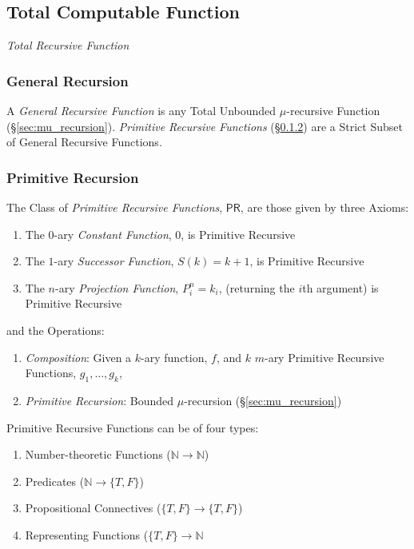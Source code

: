 \subsection{Total Computable Function}\label{sec:recursive_function}

\emph{Total Recursive Function}



\subsubsection{General Recursion}\label{sec:general_recursion}

A \emph{General Recursive Function} is any Total Unbounded
$\mu$-recursive Function (\S\ref{sec:mu_recursion}). \emph{Primitive
  Recursive Functions} (\S\ref{sec:primitive_recursion}) are a Strict
Subset of General Recursive Functions.



\subsubsection{Primitive Recursion}\label{sec:primitive_recursion}

The Class of \emph{Primitive Recursive Functions}, $\mathsf{PR}$, are
those given by three Axioms:
\begin{enumerate}
  \item The $0$-ary \emph{Constant Function}, $0$, is Primitive
    Recursive
  \item The $1$-ary \emph{Successor Function}, $S(k) = k + 1$, is
    Primitive Recursive
  \item The $n$-ary \emph{Projection Function}, $P_i^n = k_i$,
    (returning the $i$th argument) is Primitive Recursive
\end{enumerate}
and the Operations:
\begin{enumerate}
  \item \emph{Composition}: Given a $k$-ary function, $f$, and $k$
    $m$-ary Primitive Recursive Functions, $g_1, \ldots, g_k$,
  \item \emph{Primitive Recursion}: Bounded $\mu$-recursion
    (\S\ref{sec:mu_recursion})
\end{enumerate}

Primitive Recursive Functions can be of four types: \cite{kleene52}

\begin{enumerate}
\item Number-theoretic Functions ($\mathbb{N} \rightarrow \mathbb{N}$)
\item Predicates ($\mathbb{N} \rightarrow \{T,F\}$)
\item Propositional Connectives ($\{T,F\} \rightarrow \{T,F\}$)
\item Representing Functions ($\{T,F\} \rightarrow \mathbb{N}$
\end{enumerate}



